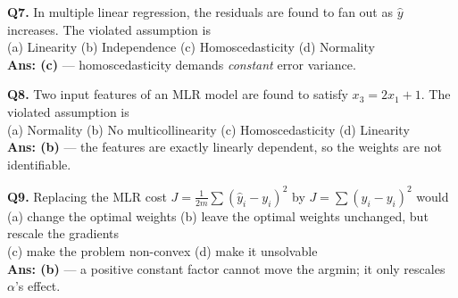\begin{mcqbox}
\textbf{Q7.} In multiple linear regression, the residuals are found to fan out as $\hat y$ increases. The violated assumption is\\
(a) Linearity \quad (b) Independence \quad (c) Homoscedasticity \quad (d) Normality\\
\textbf{Ans: (c)} --- homoscedasticity demands \emph{constant} error variance.

\textbf{Q8.} Two input features of an MLR model are found to satisfy $x_3 = 2x_1+1$. The violated assumption is\\
(a) Normality \quad (b) No multicollinearity \quad (c) Homoscedasticity \quad (d) Linearity\\
\textbf{Ans: (b)} --- the features are exactly linearly dependent, so the weights are not identifiable.

\textbf{Q9.} Replacing the MLR cost $J = \frac{1}{2m}\sum(\hat y_i-y_i)^2$ by $J = \sum(\hat y_i-y_i)^2$ would\\
(a) change the optimal weights \quad (b) leave the optimal weights unchanged, but rescale the gradients\\
(c) make the problem non-convex \quad (d) make it unsolvable\\
\textbf{Ans: (b)} --- a positive constant factor cannot move the argmin; it only rescales $\alpha$'s effect.
\end{mcqbox}

